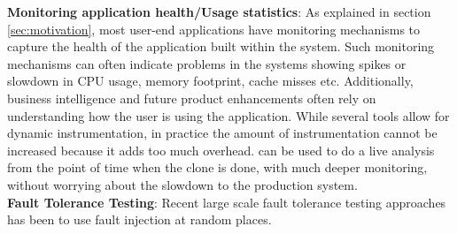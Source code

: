 \textbf{Monitoring application health/Usage statistics}: 
As explained in section \ref{sec:motivation}, most user-end applications have monitoring mechanisms to capture the health of the application built within the system.
Such monitoring mechanisms can often indicate problems in the systems showing spikes or slowdown in CPU usage, memory footprint, cache misses etc.
Additionally, business intelligence and future product enhancements often rely on understanding how the user is using the application.
While several tools allow for dynamic instrumentation, in practice the amount of instrumentation cannot be increased because it adds too much overhead.
\parikshan can be used to do a live analysis from the point of time when the clone is done, with much deeper monitoring, without worrying about the slowdown to the production system. \\
\iffalse
\textbf{Fault Tolerance Testing}: 
Recent large scale fault tolerance testing approaches has been to use fault injection at random places.
